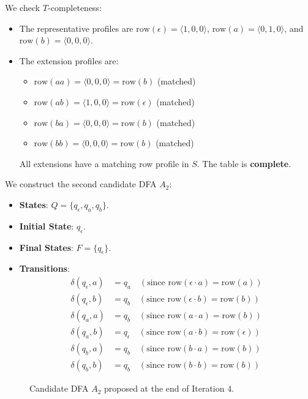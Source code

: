 We check $T$-completeness:
\begin{itemize}
  \item The representative profiles are $\text{row}(\epsilon) = \langle 1, 0, 0 \rangle$, $\text{row}(a) = \langle 0, 1, 0 \rangle$, and $\text{row}(b) = \langle 0, 0, 0 \rangle$.
  \item The extension profiles are:
  \begin{itemize}
    \item $\text{row}(aa) = \langle 0, 0, 0 \rangle = \text{row}(b)$ (matched)
    \item $\text{row}(ab) = \langle 1, 0, 0 \rangle = \text{row}(\epsilon)$ (matched)
    \item $\text{row}(ba) = \langle 0, 0, 0 \rangle = \text{row}(b)$ (matched)
    \item $\text{row}(bb) = \langle 0, 0, 0 \rangle = \text{row}(b)$ (matched)
  \end{itemize}
  All extensions have a matching row profile in $S$. The table is \textbf{complete}.
\end{itemize}

We construct the second candidate DFA $A_2$:
\begin{itemize}
  \item \textbf{States}: $Q = \{q_\epsilon, q_a, q_b\}$.
  \item \textbf{Initial State}: $q_\epsilon$.
  \item \textbf{Final States}: $F = \{q_\epsilon\}$.
  \item \textbf{Transitions}:
  \begin{align*}
    \delta(q_\epsilon, a) &= q_a \quad (\text{since } \text{row}(\epsilon \cdot a) = \text{row}(a)) \\
    \delta(q_\epsilon, b) &= q_b \quad (\text{since } \text{row}(\epsilon \cdot b) = \text{row}(b)) \\
    \delta(q_a, a) &= q_b \quad (\text{since } \text{row}(a \cdot a) = \text{row}(b)) \\
    \delta(q_a, b) &= q_\epsilon \quad (\text{since } \text{row}(a \cdot b) = \text{row}(\epsilon)) \\
    \delta(q_b, a) &= q_b \quad (\text{since } \text{row}(b \cdot a) = \text{row}(b)) \\
    \delta(q_b, b) &= q_b \quad (\text{since } \text{row}(b \cdot b) = \text{row}(b))
  \end{align*}
\end{itemize}

\begin{figure}[H]
  \centering
  \caption{Candidate DFA $A_2$ proposed at the end of Iteration 4.}
  \label{fig:dfa-iter4}
\end{figure}

